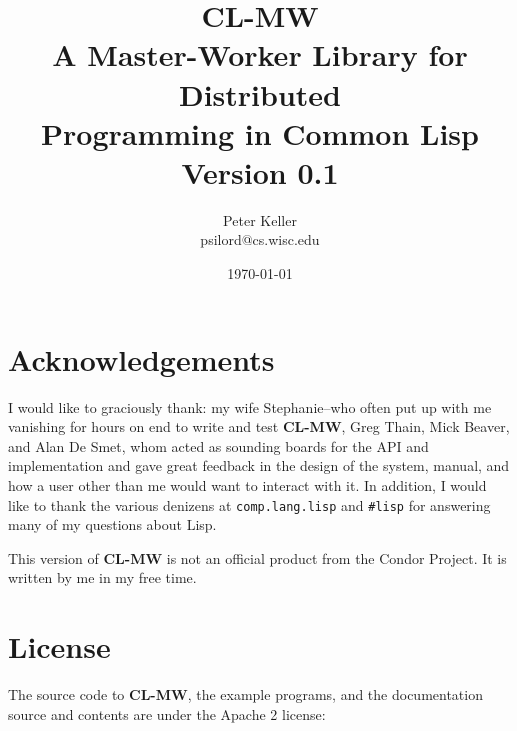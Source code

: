 \documentclass[titlepage,12pt]{book}
\newcommand{\xsmall}{\latexhtml{\small}{}}
\newcommand{\xnormalsize}{\latexhtml{\normalsize}{}}
\newcommand{\clmw}{\xsmall\textbf{CL-MW}\xnormalsize\xspace}
\begin{document}
\frontmatter 

\title{\textbf{CL-MW}\\
\normalsize A Master-Worker Library for Distributed\\
Programming in Common Lisp\\
Version 0.1}
\author{Peter Keller\\psilord@cs.wisc.edu}
\date{\today}
\maketitle
\newpage
\tableofcontents
\newpage

\chapter{Acknowledgements}

I would like to graciously thank: my wife Stephanie--who often put up
with me vanishing for hours on end to write and test \clmw, Greg Thain,
Mick Beaver, and Alan De Smet, whom acted as sounding boards for the
API and implementation and gave great feedback in the design of the
system, manual, and how a user other than me would want to interact
with it. In addition, I would like to thank the various denizens at
\texttt{comp.lang.lisp} and \texttt{\#lisp} for answering many of my
questions about Lisp.

This version of \clmw is not an official product from the Condor
Project. It is written by me in my free time.

\chapter{License}

The source code to \clmw, the example programs, and the
documentation source and contents are under the Apache 2 license:

\begin{center}
\end{center}
\end{document}
